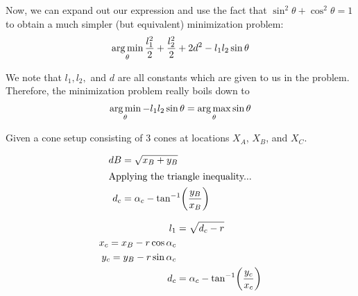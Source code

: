 Now, we can expand out our expression and use the fact that $\sin^2 \theta + \cos^2 \theta = 1$ to obtain a much simpler (but equivalent) minimization problem:
\begin{eqnarray}
  \operatorname*{arg\,min}_{\theta} \frac{l_1^2}{2} + \frac{l_2^2}{2} + 2d^2 - l_1 l_2 \sin \theta
\end{eqnarray}

We note that $l_1, l_2,$ and $d$ are all constants which are given to us in the problem. Therefore, the minimization problem really boils down to
\begin{eqnarray}
  \operatorname*{arg\,min}_{\theta} - l_1 l_2 \sin \theta = \operatorname*{arg\,max}_{\theta} \sin \theta
\end{eqnarray}


\begin{theorem}

Given a cone setup consisting of 3 cones at locations $X_A$, $X_B$, and $X_C$.


\begin{align}
dB& = \sqrt{x_B + y_B}\\
\intertext{Applying the triangle inequality...}
d_c& = \alpha_c - \tan^{-1}\paren{\frac{y_B}{x_B}}\\
\end{align}


\begin{align}
l_1& = \sqrt{d_c - r}\\
x_c = x_B - r \cos{\alpha_c}\\
y_c = y_B - r \sin{\alpha_c}\\
d_c& = \alpha_c - \tan^{-1}\paren{\frac{y_c}{x_c}}\\
\end{align}

\end{theorem}

\proof